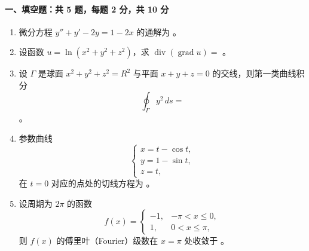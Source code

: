 \paragraph*{一、填空题：共 5 题，每题 2 分，共 10 分}
\begin{enumerate}
  \item 微分方程 $y''+y'-2y=1-2x$ 的通解为 \underline{\hspace{5cm}}。

  \item 设函数 $u=\ln(x^2+y^2+z^2)$，求 $\operatorname{div}(\operatorname{grad}u)=$ \underline{\hspace{4cm}}。

  \item 设 $\Gamma$ 是球面 $x^2+y^2+z^2=R^2$ 与平面 $x+y+z=0$ 的交线，则第一类曲线积分
  \[
    \oint_{\Gamma} y^2\,ds=
  \]
  \underline{\hspace{4cm}}。

  \item 参数曲线
  \[
    \begin{cases}
      x=t-\cos t,\\
      y=1-\sin t,\\
      z=t,
    \end{cases}
  \]
  在 $t=0$ 对应的点处的切线方程为 \underline{\hspace{6cm}}。

  \item 设周期为 $2\pi$ 的函数
  \[
    f(x)=
    \begin{cases}
      -1, & -\pi<x\le 0,\\
      1, & 0<x\le \pi,
    \end{cases}
  \]
  则 $f(x)$ 的傅里叶（Fourier）级数在 $x=\pi$ 处收敛于 \underline{\hspace{4cm}}。
\end{enumerate}


